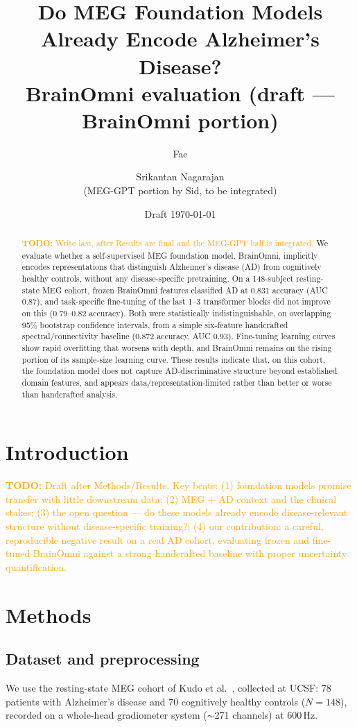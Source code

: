 \documentclass[11pt]{article}
\title{Do MEG Foundation Models Already Encode Alzheimer's Disease?\\
\large BrainOmni evaluation (draft --- BrainOmni portion)}
\author{Fae \and Srikantan Nagarajan \\ \small (MEG-GPT portion by Sid, to be integrated)}
\date{Draft \today}
\newcommand{\todo}[1]{\textcolor{orange}{\textbf{TODO:} #1}}
\begin{document}
\maketitle

\begin{abstract}
\todo{Write last, after Results are final and the MEG-GPT half is integrated.}
We evaluate whether a self-supervised MEG foundation model, BrainOmni, implicitly encodes
representations that distinguish Alzheimer's disease (AD) from cognitively healthy controls,
without any disease-specific pretraining. On a 148-subject resting-state MEG cohort, frozen
BrainOmni features classified AD at 0.831 accuracy (AUC 0.87), and task-specific fine-tuning of the
last 1--3 transformer blocks did not improve on this (0.79--0.82 accuracy). Both were statistically
indistinguishable, on overlapping 95\% bootstrap confidence intervals, from a simple six-feature
handcrafted spectral/connectivity baseline (0.872 accuracy, AUC 0.93). Fine-tuning learning curves
show rapid overfitting that worsens with depth, and BrainOmni remains on the rising portion of its
sample-size learning curve. These results indicate that, on this cohort, the foundation model does
not capture AD-discriminative structure beyond established domain features, and appears
data/representation-limited rather than better or worse than handcrafted analysis.
\end{abstract}

\section{Introduction}
\todo{Draft after Methods/Results. Key beats: (1) foundation models promise transfer with little
downstream data; (2) MEG + AD context and the clinical stakes; (3) the open question --- do these
models already encode disease-relevant structure without disease-specific training?; (4) our
contribution: a careful, reproducible negative result on a real AD cohort, evaluating frozen and
fine-tuned BrainOmni against a strong handcrafted baseline with proper uncertainty quantification.}

\section{Methods}

\subsection{Dataset and preprocessing}
We use the resting-state MEG cohort of Kudo et al.\ \cite{kudo2023meg}, collected at UCSF:
78 patients with Alzheimer's disease and 70 cognitively healthy controls ($N=148$), recorded on a
whole-head gradiometer system ($\sim$271 channels) at 600\,Hz.
\end{document}
